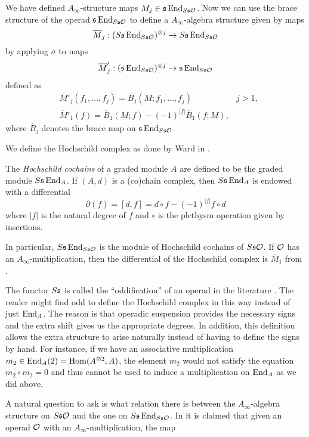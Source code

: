 \documentclass[Thesis.tex]{subfiles}
\begin{document}
We have defined $A_\infty$-structure maps $M_j\in\mathfrak{s}\operatorname{End}_{S\mathfrak{s}{\mathcal O}}$. Now we can use the brace structure of the operad $\mathfrak{s}\operatorname{End}_{S\mathfrak{s}{\mathcal O}}$ to define a $A_\infty$-algebra structure given by maps
\begin{equation}\label{barmaps}
\overline{M}_j:(S\mathfrak{s}\operatorname{End}_{S\mathfrak{s}{\mathcal O}})^{\otimes j}\to S\mathfrak{s}\operatorname{End}_{S\mathfrak{s}{\mathcal O}}
\end{equation}
by applying $\overline{\sigma}$ to maps
\[\overline{M}'_j:(\mathfrak{s}\operatorname{End}_{S\mathfrak{s}{\mathcal O}})^{\otimes j}\to \mathfrak{s}\operatorname{End}_{S\mathfrak{s}{\mathcal O}}\]
defined as
\begin{align*}
&\overline{M}'_j(f_1,\dots,f_j)=\overline{B}_j(M;f_1,\dots, f_j) & j>1,\\
&\overline{M}'_1(f)=\overline{B}_1(M;f)-(-1)^{|f|}\overline{B}_1(f;M),
\end{align*}
where $\overline{B}_j$ denotes the brace map on $\mathfrak{s}\operatorname{End}_{S\mathfrak{s}{\mathcal O}}$.

We define the Hochschild complex as done by Ward in \cite{ward}.

\begin{defin}
The \emph{Hochschild cochains} of a graded module $A$ are defined to be the graded module $S\mathfrak{s}\operatorname{End}_A$. If $(A,d)$ is a (co)chain complex, then $S\mathfrak{s}\operatorname{End}_A$ is endowed with a differential \[\partial(f)=[d,f]=d\circ f -(-1)^{|f|}f\circ d\] where $|f|$ is the natural degree of $f$ and $\circ$ is the plethysm operation given by insertions.
\end{defin}
In particular, $S\mathfrak{s}\operatorname{End}_{S\mathfrak{s}{\mathcal O}}$ is the module of Hochschild cochains of $S\mathfrak{s}{\mathcal O}$. If ${\mathcal O}$ has an $A_\infty$-multiplication, then the differential of the Hochschild complex is $\overline{M}_1$ from .
\begin{remark}
The functor $S\mathfrak{s}$ is called the ``oddification'' of an operad in the literature \cite{wardthesis}. %
The reader might find odd to define the Hochschild complex in this way instead of just $\operatorname{End}_A$. The reason is that operadic suspension provides the necessary signs and the extra shift gives us the appropriate degrees. In addition, this definition allows the extra structure to arise naturally instead of having to define the signs by hand. For instance, if we have an associative multiplication $m_2\in\operatorname{End}_A(2)=\operatorname{Hom}(A^{\otimes 2},A)$, the element $m_2$ would not satisfy the equation $m_2\circ m_2=0$ and thus cannot be used to induce a multiplication on $\operatorname{End}_A$ as we did above.
\end{remark}

 A natural question to ask is what relation there is between the $A_\infty$-algebra structure on $S\mathfrak{s}{\mathcal O}$ and the one on $S\mathfrak{s}\operatorname{End}_{S\mathfrak{s}{\mathcal O}}$. In \cite{GV} it is claimed that given an operad ${\mathcal O}$ with an $A_\infty$-multiplication, the map
\end{document}
